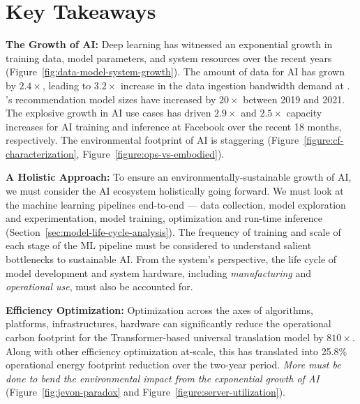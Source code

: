 \section{Key Takeaways}
\label{sec:takeaways}


\textbf{The Growth of AI:} Deep learning has witnessed an exponential growth in training data, model parameters, and system resources over the recent years (Figure~\ref{fig:data-model-system-growth}).
The amount of data for AI has grown by $2.4\times$, leading to $3.2\times$ increase in the data ingestion bandwidth demand at \fb.
\fb's recommendation model sizes have increased by $20\times$ between 2019 and 2021.
The explosive growth in AI use cases has driven $2.9\times$ and $2.5\times$ capacity increases for AI training and inference at Facebook over the recent 18 months, respectively.
The environmental footprint of AI is staggering (Figure~\ref{figure:cf-characterization}, Figure~\ref{figure:ops-vs-embodied}).

    
\textbf{A Holistic Approach:} To ensure an environmentally-sustainable growth of AI, we must consider the AI ecosystem holistically going forward.
We must look at the machine learning pipelines end-to-end --- data collection, model exploration and experimentation, model training, optimization and run-time inference (Section~\ref{sec:model-life-cycle-analysis}). 
The frequency of training and scale of each stage of the ML pipeline must be considered to understand salient bottlenecks to sustainable AI.
From the system's perspective, the life cycle of model development and system hardware, including \textit{manufacturing} and \textit{operational use}, must also be accounted for. 

\textbf{Efficiency Optimization:} 
Optimization across the axes of algorithms, platforms, infrastructures, hardware can significantly reduce the operational carbon footprint for the Transformer-based universal translation model by $810\times$. Along with other efficiency optimization at-scale, this has translated into 25.8\% operational energy footprint reduction over the two-year period. 
\textit{More must be done to bend the environmental impact from the exponential growth of AI} (Figure~\ref{fig:jevon-paradox} and Figure~\ref{figure:server-utilization}).

